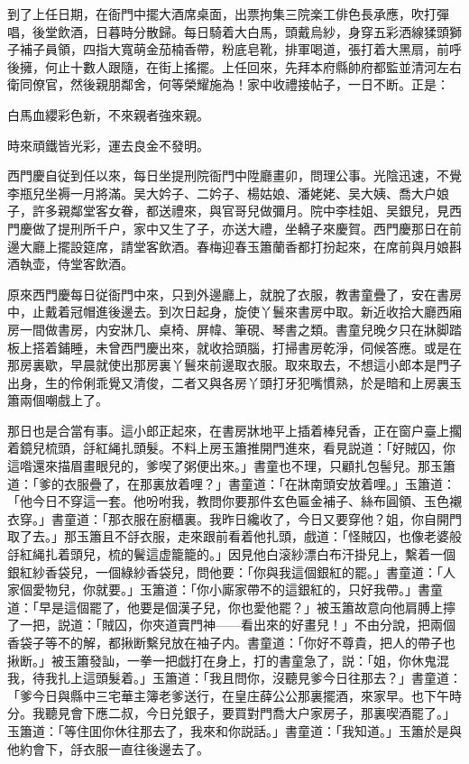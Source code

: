 到了上任日期，在衙門中擺大酒席桌面，出票拘集三院楽工俳色長承應，吹打彈唱，後堂飲酒，日暮時分散歸。每日騎着大白馬，頭戴烏紗，身穿五彩洒線猱頭獅子補子員領，四指大寬萌金茄楠香帶，粉底皂靴，排軍喝道，張打着大黑扇，前呼後擁，何止十數人跟隨，在街上搖擺。上任回來，先拜本府縣帥府都監並清河左右衛同僚官，然後親朋鄰舍，何等榮耀施為！家中收禮接帖子，一日不断。正是：

白馬血纓彩色新，不來親者強來親。

時來頑鐵皆光彩，運去良金不發明。

西門慶自従到任以來，每日坐提刑院衙門中陞廳畫卯，問理公事。光陰迅速，不覺李瓶兒坐褥一月將滿。吴大妗子、二妗子、楊姑娘、潘姥姥、吴大姨、喬大户娘子，許多親鄰堂客女眷，都送禮來，與官哥兒做彌月。院中李桂姐、吴銀兒，見西門慶做了提刑所千户，家中又生了子，亦送大禮，坐轎子來慶賀。西門慶那日在前邊大廳上擺設筵席，請堂客飲酒。春梅迎春玉簫蘭香都打扮起來，在席前與月娘斟酒執壶，侍堂客飲酒。

原來西門慶每日従衙門中來，只到外邊廳上，就脫了衣服，教書童疊了，安在書房中，止戴着冠帽進後邊去。到次日起身，旋使丫鬟來書房中取。新近收拾大廳西廂房一間做書房，内安牀几、桌椅、屏幃、筆硯、琴書之類。書童兒晚夕只在牀脚踏板上搭着鋪睡，未曾西門慶出來，就收拾頭腦，打掃書房乾淨，伺候答應。或是在那房裏歇，早晨就使出那房裏丫鬟來前邊取衣服。取來取去，不想這小郎本是門子出身，生的伶俐乖覺又清俊，二者又與各房丫頭打牙犯嘴慣熟，於是暗和上房裏玉簫兩個嘲戲上了。

那日也是合當有事。這小郎正起來，在書房牀地平上插着棒兒香，正在窗户臺上擱着鏡兒梳頭，㧱紅䋲扎頭髮。不料上房玉簫推開門進來，看見説道：「好賊囚，你這喒還來描眉畫眼兒的，爹喫了粥便出來。」書童也不理，只顧扎包髻兒。那玉簫道：「爹的衣服疊了，在那裏放着哩？」書童道：「在牀南頭安放着哩。」玉簫道：「他今日不穿這一套。他吩咐我，教問你要那件玄色匾金補子、絲布圓領、玉色襯衣穿。」書童道：「那衣服在廚櫃裏。我昨日纔收了，今日又要穿他？姐，你自開門取了去。」那玉簫且不㧱衣服，走來跟前看着他扎頭，戲道：「怪賊囚，也像老婆般㧱紅䋲扎着頭兒，梳的鬢這虚籠籠的。」因見他白滚紗漂白布汗掛兒上，繫着一個銀紅紗香袋兒，一個綠紗香袋兒，問他要：「你與我這個銀紅的罷。」書童道：「人家個愛物兒，你就要。」玉簫道：「你小廝家帶不的這銀紅的，只好我帶。」書童道：「早是這個罷了，他要是個漢子兒，你也愛他罷？」被玉簫故意向他肩膊上擰了一把，説道：「賊囚，你夾道賣門神——看出來的好畫兒！」不由分說，把兩個香袋子等不的解，都揪断繫兒放在袖子内。書童道：「你好不尊貴，把人的帶子也揪断。」被玉簫發訕，一拳一把戯打在身上，打的書童急了，説：「姐，你休鬼混我，待我扎上這頭髮着。」玉簫道：「我且問你，沒聽見爹今日往那去？」書童道：「爹今日與縣中三宅華主簿老爹送行，在皇庄薛公公那裏擺酒，來家早。也下午時分。我聽見會下應二叔，今日兑銀子，要買對門喬大户家房子，那裏喫酒罷了。」玉簫道：「等住囬你休往那去了，我來和你説話。」書童道：「我知道。」玉簫於是與他約會下，㧱衣服一直往後邊去了。

